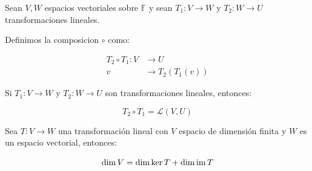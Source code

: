 		\begin{definicion}
			Sean $V, W$ espacios vectoriales sobre $\mathbb{F}$ y sean $T_1 \colon V \to W$ y $T_2 \colon W \to U$ transformaciones lineales.

			Definimos la composicion $\circ$ como:

			\begin{align}
				T_2 \circ T_1 \colon V &\to U \nonumber \\
				v &\to T_2(T_1(v))
			\end{align}
		\end{definicion}

		\begin{proposicion}
			Si $T_1 \colon V \to W$ y $T_2 \colon W \to U$ son transformaciones lineales, entonces:

			\begin{equation}
				T_2 \circ T_1 = \mathcal{L}(V, U)
			\end{equation}
		\end{proposicion}

		\begin{teorema}
			Sea $T \colon V \to W$ una transformación lineal con $V$ espacio de dimensión finita y $W$ es un espacio vectorial, entonces:

			\begin{equation}
				\dim{V} = \dim{\ker{T}} + \dim{\operatorname{im}{T}}
			\end{equation}
		\end{teorema}


